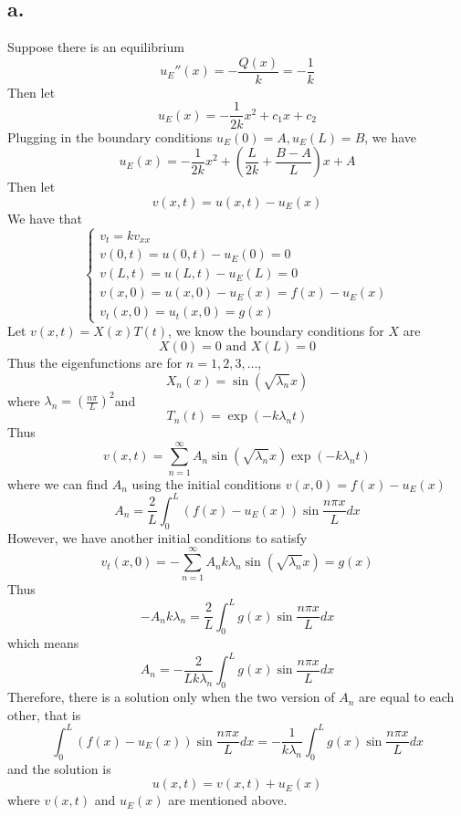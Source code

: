\documentclass[11pt]{article}
\theoremstyle{mystyle}
\theoremstyle{definition}
\begin{document}
\subsection*{a.}
Suppose there is an equilibrium 
\[
  u_E''(x) = - \displaystyle\frac{Q(x)}{k} = -\displaystyle\frac{1}{k}
\]
Then let 
\[
  u_E(x) = - \displaystyle\frac{1}{2k}x^2 + c_1 x + c_2
\]
Plugging in the boundary conditions $u_E(0) = A, u_E(L) = B$, we have 
\[
  u_E(x) = -\displaystyle\frac{1}{2k}x^2 + \left(\displaystyle\frac{L}{2k} + \displaystyle\frac{B-A}{L}\right)x+ A 
\]
Then let 
\[
  v(x,t) = u(x,t) - u_E(x)
\]
We have that 
\[
  \begin{cases}
    v_t = k v_{xx} \\
    v(0,t) = u(0,t) - u_E(0) = 0 \\
    v(L,t) = u(L,t) - u_E(L) = 0 \\
    v(x,0) = u(x,0) - u_E(x) = f(x) - u_E(x) \\
    v_t(x,0) = u_t(x,0) = g(x)
  \end{cases}
\]
Let $v(x,t) = X(x) T(t)$, we know the boundary conditions for $X$ are 
\[
  X(0) = 0 \text{ and } X(L) = 0
\]
Thus the eigenfunctions are for $n=1,2,3, \hdots$, 
\[
  X_n(x) = \sin(\sqrt{\lambda_n}x)
\]
where $\lambda_n = \left( \displaystyle\frac{n\pi}{L}\right)^2$and 
\[
  T_n(t) = \exp(-k \lambda_n t)
\]
Thus 
\[
  v(x,t) = \sum_{n=1}^\infty A_n \sin(\sqrt{\lambda_n} x) \exp(-k\lambda_n t)
\]
where we can find $A_n$ using the initial conditions $v(x,0) = f(x) - u_E(x)$
\[
  A_n = \displaystyle\frac{2}{L} \int_0^L (f(x) - u_E(x)) \sin \displaystyle\frac{n\pi x}{L} dx
\]
However, we have another initial conditions to satisfy
\[
  v_t(x,0) = - \sum_{n=1}^\infty A_n k \lambda_n \sin(\sqrt{\lambda_n}x) = g(x)
\]
Thus 
\[
  -A_n k\lambda_n =  \displaystyle\frac{2}{L} \int_0^L g(x) \sin \displaystyle\frac{n\pi x}{L} dx
\]
which means
\[
  A_n = -\displaystyle\frac{2}{Lk \lambda_n} \int_0^L g(x) \sin\displaystyle\frac{n\pi x}{L} dx
\]
Therefore, there is a solution only when the two version of $A_n$ are equal to each other, that is 
\[
  \int_0^L (f(x) - u_E(x)) \sin \displaystyle\frac{n\pi x}{L} dx = -\displaystyle\frac{1}{k \lambda_n} \int_0^L g(x) \sin \displaystyle\frac{n\pi x}{L} dx
\]
and the solution is 
\[
  u(x,t) = v(x,t) + u_E(x)
\]
where $v(x,t)$ and $u_E(x)$ are mentioned above. 
\end{document}

